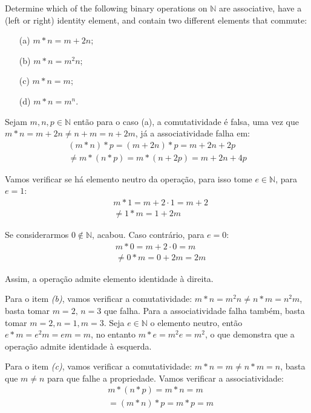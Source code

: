 \begin{exercicio}{1.18}
Determine which of the following binary operations on \(\mathbb{N}\) are associative, have a (left or right) identity element, and contain two different elements that commute:

\begin{itemize}
	\item[(a)] \(m * n = m + 2n\);
	\item[(b)] \(m * n = m^2 n\);
	\item[(c)] \(m * n = m\);
	\item[(d)] \(m * n = m^n\).
\end{itemize}
\end{exercicio}
\begin{solucao}
Sejam \(m,n,p \in \mathbb{N}\) então para o caso (a), a comutatividade é falsa, uma vez que \(m * n = m + 2n \neq n + m = n + 2m\), já a associatividade falha em:
\begin{align*}
		(m * n) * p = (m + 2n) * p = m + 2n + 2p\\
		\neq m * (n * p) = m * (n + 2p) = m + 2n + 4p
\end{align*}

Vamos verificar se há elemento neutro da operação, para isso tome $e \in \mathbb{N}$, para $e = 1$:
\begin{align*}
	&m * 1 = m + 2 \cdot 1 = m + 2 \\
	&\neq 1 * m = 1 + 2m
\end{align*}

Se considerarmos $0 \not \in \mathbb{N}$, acabou. Caso contrário, para $e = 0$:
\begin{align*}
	&m * 0 = m + 2 \cdot 0 = m \\
	&\neq 0 * m = 0 + 2m = 2m
\end{align*}

Assim, a operação admite elemento identidade à direita.

Para o item \textit{(b)}, vamos verificar a comutatividade: $m * n = m^2 n \neq n * m = n^2 m$, basta tomar $m = 2, \, n = 3$ que falha. Para a associatividade falha também, basta tomar $m = 2, n = 1, m = 3$. Seja $e \in \mathbb{N}$ o elemento neutro, então $e * m = e^2 m = em = m$, no entanto $m * e = m^2 e = m^2$, o que demonstra que a operação admite identidade à esquerda. 

Para o item \textit{(c)}, vamos verificar a comutatividade: $m * n = m \neq n * m = n$, basta que $m \neq n$ para que falhe a propriedade. Vamos verificar a associatividade:
\begin{align*}
	&m * (n * p) = m * n = m \\
	& = (m * n) * p = m * p = m \\
\end{align*}


\end{solucao}

